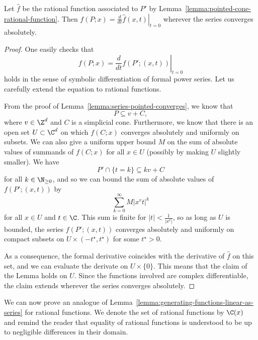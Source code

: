 \begin{lemma}
  Let $\hat f$ be the rational function associated to $P'$ by Lemma~\ref{lemma:pointed-cone-rational-function}.
  Then
  $f(P;x) = \left. \frac{d}{dt} \hat f(x,t) \right\rvert_{t = 0}$
  wherever the series converges absolutely.
\end{lemma}
\begin{proof}
  One easily checks that
  \[
    f(P;x) = \left. \frac{d}{dt} f(P';(x,t)) \right\rvert_{t = 0}
  \]
  holds in the sense of symbolic differentiation of formal power series.
  Let us carefully extend the equation to rational functions.

  From the proof of Lemma~\ref{lemma:series-pointed-converges},
  we know that
  \[
    P \subseteq v + C,
  \]
  where $v \in \Z^d$ and $C$ is a simplicial cone.
  Furthermore, we know that there is an open set $U \subset \C^d$
  on which $f(C;x)$ converges absolutely and uniformly on subsets.
  We can also give a uniform upper bound $M$ on the sum of absolute values of summands of $f(C;x)$
  for all $x \in U$ (possibly by making $U$ slightly smaller).
  We have
  \[
    P' \cap \{ t = k \} \subseteq kv + C
  \]
  for all $k \in \N_{\geq 0}$,
  and so we can bound the sum of absolute values of $f(P';(x,t))$ by
  \[
    \sum_{k=0}^\infty M |x^v t|^k
  \]
  for all $x \in U$ and $t \in \C$.
  This sum is finite for $|t| < \frac{1}{|x^v|}$,
  so as long as $U$ is bounded,
  the series $f(P';(x,t))$ converges absolutely and uniformly on compact subsets on $U \times (-t^\star, t^\star)$ for some $t^\star > 0$.

  As a consequence, the formal derivative coincides with the derivative of $\hat f$ on this set,
  and we can evaluate the derivate on $U \times \{ 0 \}$.
  This means that the claim of the Lemma holds on $U$.
  Since the functions involved are complex differentiable,
  the claim extends wherever the series converges absolutely.
\end{proof}

We can now prove an analogue of Lemma~\ref{lemma:generating-functions-linear-as-series}
for rational functions.
We denote the set of rational functions by $\C(x)$
and remind the reader that equality of rational functions is understood to be up to negligible differences
in their domain.

